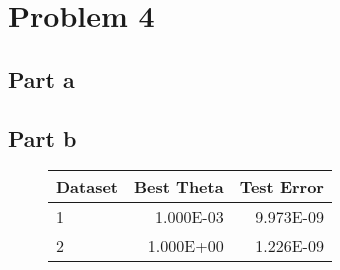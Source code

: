 \documentclass[12pt]{report}
\begin{document}
\section*{Problem 4}
\subsection*{Part a}

\subsection*{Part b}
\begin{figure}[H]
  \centering
  \begin{tabular}{lrr}
    \toprule
    Dataset & Best Theta & Test Error \\
    \midrule
    1 & 1.000E-03 & 9.973E-09 \\
    2 & 1.000E+00 & 1.226E-09 \\
    \bottomrule
    \end{tabular}
\end{figure}
\end{document}
